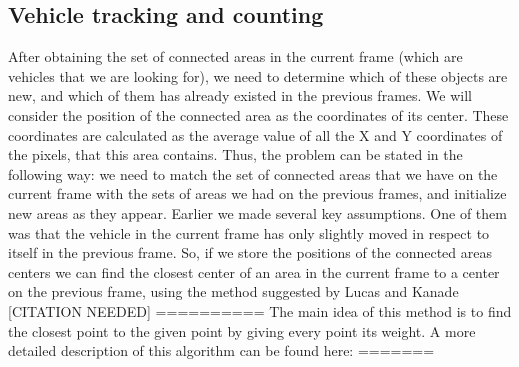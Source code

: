 \documentclass[12pt,a4paper,oneside,titlepage]{article}
\begin{document}
\subsection{Vehicle tracking and counting}



After obtaining the set of connected areas in the current frame (which are vehicles that we are looking for), we need to determine which of these objects are new, and which of them has already existed in the previous frames.
We will consider the position of the connected area as the coordinates of its center.
These coordinates are calculated as the average value of all the X and Y coordinates of the pixels, that this area contains.
Thus, the problem can be stated in the following way: we need to match the set of connected areas that we have on the current frame with the sets of areas we had on the previous frames, and initialize new areas as they appear.
Earlier we made several key assumptions.
One of them was that the vehicle in the current frame has only slightly moved in respect to itself in the previous frame.
So, if we store the positions of the connected areas centers we can find the closest center of an area in the current frame to a center on the previous frame, using the method suggested by Lucas and Kanade [CITATION NEEDED] ==========
The main idea of this method is to find the closest point to the given point by giving every point its weight.
A more detailed description of this algorithm can be found here: =======
\end{document}

